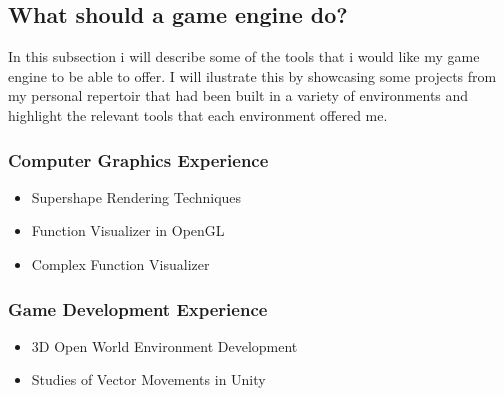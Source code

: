         \subsection{What should a game engine do?}
            In this subsection i will describe some of the tools that i would like my game engine to be able to offer.
            I will ilustrate this by showcasing some projects from my personal repertoir that had been built in a variety of environments and highlight the relevant tools that each environment offered me.

            \subsubsection{Computer Graphics Experience}
                \begin{itemize} 
                    \item Supershape Rendering Techniques 
                    \item Function Visualizer in OpenGL 
                    \item Complex Function Visualizer 
                \end{itemize}

            \subsubsection{Game Development Experience} 
                \begin{itemize} 
                    \item 3D Open World Environment Development 
                    \item Studies of Vector Movements in Unity 
                \end{itemize}

